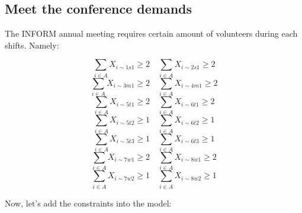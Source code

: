 \documentclass[11pt]{article}
\begin{document}
\subsection{Meet the conference
demands}\label{meet-the-conference-demands}

The INFORM annual meeting requires certain amount of volunteers during
each shifts. Namely:

\[
\sum_{i\in A}  X_{i\sim 1s1} \geq 2 \quad
\sum_{i\in A}  X_{i\sim 2s1} \geq 2 \]
\[\sum_{i\in A}  X_{i\sim 3m1} \geq 2 \quad
\sum_{i\in A}  X_{i\sim 4m1} \geq 2 \]
\[\sum_{i\in A}  X_{i\sim 5t1} \geq 2 \quad
\sum_{i\in A}  X_{i\sim 6t1} \geq 2 \]
\[\sum_{i\in A}  X_{i\sim 5t2} \geq 1 \quad
\sum_{i\in A}  X_{i\sim 6t2} \geq 1 \]
\[\sum_{i\in A}  X_{i\sim 5t3} \geq 1 \quad
\sum_{i\in A}  X_{i\sim 6t3} \geq 1 \]
\[\sum_{i\in A}  X_{i\sim 7w1} \geq 2 \quad
\sum_{i\in A}  X_{i\sim 8w1} \geq 2 \]
\[\sum_{i\in A}  X_{i\sim 7w2} \geq 1 \quad
\sum_{i\in A}  X_{i\sim 8w2} \geq 1 \]

Now, let's add the constraints into the model:
\end{document}
